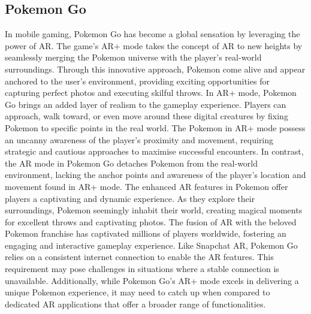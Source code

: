 \subsection*{Pokemon Go}
In mobile gaming, Pokemon Go has become a global sensation by leveraging the power of \ac{AR}. The game's AR+ mode takes the concept of \ac{AR} to new heights by seamlessly merging the Pokemon universe with the player's real-world surroundings. Through this innovative approach, Pokemon come alive and appear anchored to the user's environment, providing exciting opportunities for capturing perfect photos and executing skilful throws.
In AR+ mode, Pokemon Go brings an added layer of realism to the gameplay experience. Players can approach, walk toward, or even move around these digital creatures by fixing Pokemon to specific points in the real world. The Pokemon in AR+ mode possess an uncanny awareness of the player's proximity and movement, requiring strategic and cautious approaches to maximise successful encounters.
In contrast, the \ac{AR} mode in Pokemon Go detaches Pokemon from the real-world environment, lacking the anchor points and awareness of the player's location and movement found in AR+ mode.
The enhanced \ac{AR} features in Pokemon offer players a captivating and dynamic experience. As they explore their surroundings, Pokemon seemingly inhabit their world, creating magical moments for excellent throws and captivating photos. The fusion of \ac{AR} with the beloved Pokemon franchise has captivated millions of players worldwide, fostering an engaging and interactive gameplay experience.
Like Snapchat AR, Pokemon Go relies on a consistent internet connection to enable the \ac{AR} features. This requirement may pose challenges in situations where a stable connection is unavailable. Additionally, while Pokemon Go's AR+ mode excels in delivering a unique Pokemon experience, it may need to catch up when compared to dedicated \ac{AR} applications that offer a broader range of functionalities.

